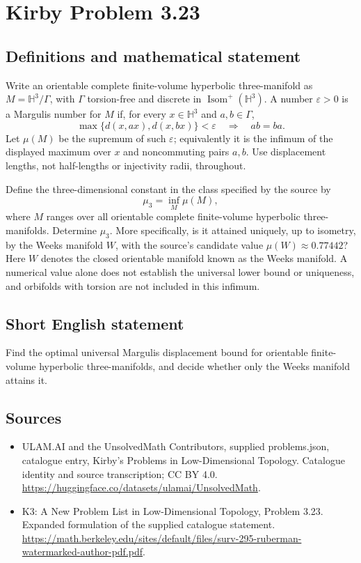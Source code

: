 \documentclass[11pt,a4paper]{article}
\begin{document}
\section*{Kirby Problem 3.23}\label{statement}

\subsection{Definitions and mathematical statement}
Write an orientable complete finite-volume hyperbolic three-manifold as
$M=\mathbb H^3/\Gamma$, with $\Gamma$ torsion-free and discrete in
$\operatorname{Isom}^+(\mathbb H^3)$. A number $\varepsilon>0$ is a
Margulis number for $M$ if, for every $x\in\mathbb H^3$ and $a,b\in\Gamma$,
\[
 \max\{d(x,ax),d(x,bx)\}<\varepsilon\quad\Longrightarrow\quad ab=ba.
\]
Let $\mu(M)$ be the supremum of such $\varepsilon$; equivalently it is
the infimum of the displayed maximum over $x$ and noncommuting pairs $a,b$.
Use displacement lengths, not half-lengths or injectivity radii, throughout.

Define the three-dimensional constant in the class specified by the source by
\[
 \mu_3=\inf_M\mu(M),
\]
where $M$ ranges over all orientable complete finite-volume hyperbolic
three-manifolds. Determine $\mu_3$. More specifically, is it attained uniquely,
up to isometry, by the Weeks manifold $W$, with the source's candidate value
$\mu(W)\approx0.77442$? Here $W$ denotes the closed orientable manifold
known as the Weeks manifold. A numerical value alone does not establish the
universal lower bound or uniqueness, and orbifolds with torsion are not included
in this infimum.
\subsection{Short English statement}
Find the optimal universal Margulis displacement bound for orientable finite-volume hyperbolic three-manifolds, and decide whether only the Weeks manifold attains it.
\subsection{Sources}
\begin{itemize}
\item[S1] ULAM.AI and the UnsolvedMath Contributors, supplied problems.json, catalogue entry, Kirby's Problems in Low-Dimensional Topology. Catalogue identity and source transcription; CC BY 4.0.
\url{https://huggingface.co/datasets/ulamai/UnsolvedMath}.
\item[S2] K3: A New Problem List in Low-Dimensional Topology, Problem 3.23. Expanded formulation of the supplied catalogue statement.
\url{https://math.berkeley.edu/sites/default/files/surv-295-ruberman-watermarked-author-pdf.pdf}.
\end{itemize}
\end{document}
